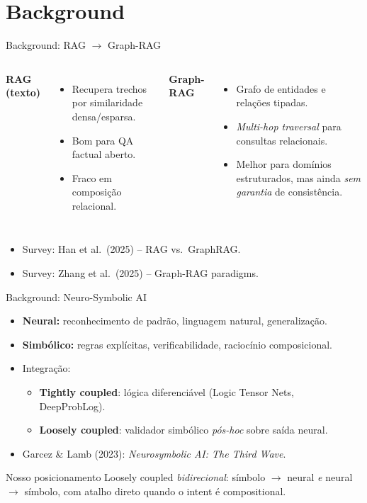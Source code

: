 \documentclass[aspectratio=169]{beamer}
\begin{document}
\section{Background}

\begin{frame}{Background: RAG $\to$ Graph-RAG}
  \begin{columns}[T,onlytextwidth]
      \textbf{RAG (texto)}
      \begin{itemize}\small
        \item Recupera trechos por similaridade densa/esparsa.
        \item Bom para QA factual aberto.
        \item Fraco em composição relacional.
      \end{itemize}
      \textbf{Graph-RAG}
      \begin{itemize}\small
        \item Grafo de entidades e relações tipadas.
        \item \emph{Multi-hop traversal} para consultas relacionais.
        \item Melhor para domínios estruturados, mas ainda \emph{sem garantia} de consistência.
      \end{itemize}
  \end{columns}
  \vspace{1em}
  \begin{itemize}
    \item Survey: Han et al.\ (2025) -- RAG vs.\ GraphRAG.
    \item Survey: Zhang et al.\ (2025) -- Graph-RAG paradigms.
  \end{itemize}
\end{frame}

\begin{frame}{Background: Neuro-Symbolic AI}
  \begin{itemize}
    \item \textbf{Neural:} reconhecimento de padrão, linguagem natural, generalização.
    \item \textbf{Simbólico:} regras explícitas, verificabilidade, raciocínio composicional.
    \item Integração:
      \begin{itemize}
        \item \textbf{Tightly coupled}: lógica diferenciável (Logic Tensor Nets, DeepProbLog).
        \item \textbf{Loosely coupled}: validador simbólico \emph{pós-hoc} sobre saída neural.
      \end{itemize}
    \item Garcez \& Lamb (2023): \emph{Neurosymbolic AI: The Third Wave}.
  \end{itemize}
  \vspace{0.5em}
  \begin{block}{Nosso posicionamento}
    Loosely coupled \emph{bidirecional}: símbolo $\to$ neural \emph{e} neural $\to$ símbolo, com atalho direto quando o intent é compositional.
  \end{block}
\end{frame}
\end{document}
